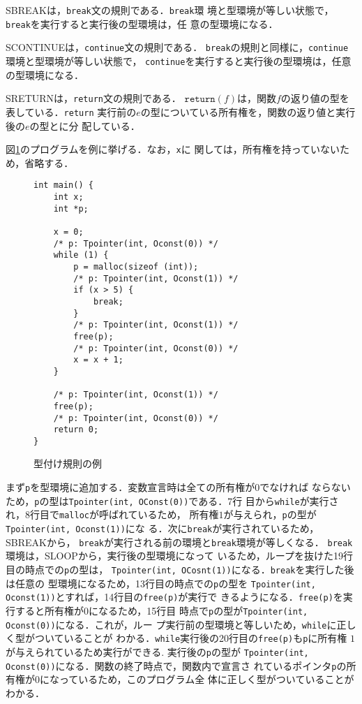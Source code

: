 S{\footnotesize BREAK}は，\texttt{break}文の規則である．\texttt{break}環
境と型環境が等しい状態で，\texttt{break}を実行すると実行後の型環境は，任
意の型環境になる．

S{\footnotesize CONTINUE}は，\texttt{continue}文の規則である．
\texttt{break}の規則と同様に，\texttt{continue}環境と型環境が等しい状態で，
\texttt{continue}を実行すると実行後の型環境は，任意の型環境になる．

S{\footnotesize RETURN}は，\texttt{return}文の規則である．
$\texttt{return}(f)$は，関数$f$の返り値の型を表している．\texttt{return}
実行前の$e$の型についている所有権を，関数の返り値と実行後の$e$の型とに分
配している．

\begin{example}[型付け規則]
  図\ref{extend_typing_example}のプログラムを例に挙げる．なお，\verb|x|に
  関しては，所有権を持っていないため，省略する．
\begin{figure}[htbp]
    \begin{lstlisting}
int main() {
    int x;
    int *p;

    x = 0;
    /* p: Tpointer(int, Oconst(0)) */
    while (1) {
        p = malloc(sizeof (int));
        /* p: Tpointer(int, Oconst(1)) */
        if (x > 5) {
            break;
        }
        /* p: Tpointer(int, Oconst(1)) */
        free(p);
        /* p: Tpointer(int, Oconst(0)) */
        x = x + 1;
    }

    /* p: Tpointer(int, Oconst(1)) */
    free(p);
    /* p: Tpointer(int, Oconst(0)) */
    return 0;
}
  \end{lstlisting}
  \caption{型付け規則の例}
  \label{extend_typing_example}
\end{figure}

  まず\verb|p|を型環境に追加する．変数宣言時は全ての所有権が$0$でなければ
  ならないため，\verb|p|の型は\verb|Tpointer(int, OConst(0))|である．7行
  目から\verb|while|が実行され，8行目で\verb|malloc|が呼ばれているため，
  所有権$1$が与えられ，\verb|p|の型が\verb|Tpointer(int, Oconst(1))|にな
  る．次に\verb|break|が実行されているため，S{\footnotesize BREAK}から，
  \verb|break|が実行される前の環境と\texttt{break}環境が等しくなる．
  \texttt{break}環境は，S{\footnotesize LOOP}から，実行後の型環境になって
  いるため，ループを抜けた19行目の時点での\verb|p|の型は，
  \verb|Tpointer(int, OCosnt(1))|になる．\verb|break|を実行した後は任意の
  型環境になるため，13行目の時点での\verb|p|の型を
  \verb|Tpointer(int, Oconst(1))|とすれば，14行目の\verb|free(p)|が実行で
  きるようになる．\verb|free(p)|を実行すると所有権が$0$になるため，15行目
  時点で\verb|p|の型が\verb|Tpointer(int, Oconst(0))|になる．これが，ルー
  プ実行前の型環境と等しいため，\verb|while|に正しく型がついていることが
  わかる．\verb|while|実行後の20行目の\verb|free(p)|も\verb|p|に所有権
  $1$が与えられているため実行ができる.  実行後の\verb|p|の型が
  \verb|Tpointer(int, Oconst(0))|になる．関数の終了時点で，関数内で宣言さ
  れているポインタ\verb|p|の所有権が$0$になっているため，このプログラム全
  体に正しく型がついていることがわかる．

\end{example}